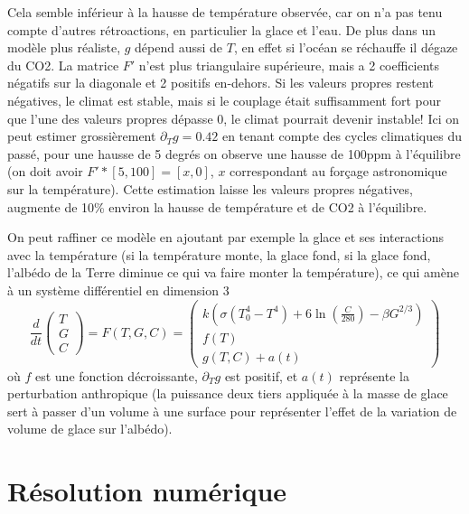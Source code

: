 \documentclass[a4paper,11pt]{book}
\begin{document}
\begin{giacjshere}
Cela semble inf\'erieur \`a la hausse de temp\'erature observ\'ee,
car on n'a pas tenu compte d'autres r\'etroactions, en particulier
la glace et l'eau.
De plus dans un mod\`ele plus r\'ealiste, $g$ d\'epend aussi de $T$, 
en effet si l'oc\'ean
se r\'echauffe il d\'egaze du CO2. La matrice $F'$ n'est plus triangulaire
sup\'erieure, mais a 2 coefficients n\'egatifs sur la diagonale et
2 positifs en-dehors. Si les valeurs propres restent n\'egatives,
le climat est stable, mais si le couplage \'etait suffisamment
fort pour que l'une des valeurs propres d\'epasse 0, 
le climat pourrait devenir instable! Ici on peut estimer grossi\`erement
$\partial_T g=0.42$ en tenant compte des cycles climatiques du pass\'e,
pour une hausse de 5 degr\'es on observe
une hausse de 100ppm \`a l'\'equilibre (on doit avoir $F'*[5,100]=[x,0]$,
$x$ correspondant au for\c{c}age astronomique sur la temp\'erature).
Cette estimation laisse les valeurs propres n\'egatives,
augmente de 10\% environ la hausse de temp\'erature et de CO2 \`a
l'\'equilibre.

On peut raffiner ce mod\`ele en ajoutant par exemple la glace
et ses interactions avec la temp\'erature (si la temp\'erature
monte, la glace fond, si la glace fond, l'alb\'edo de la Terre diminue
ce qui va faire monter la temp\'erature), ce qui am\`ene \`a un
syst\`eme diff\'erentiel en dimension 3
\[ \frac{d}{dt} \left(\begin{array}{c}
T \\
G \\
C
\end{array}\right) =
F(T,G,C) = \left(\begin{array}{c}
k (\sigma(T_0^4-T^4)+6 \ln(\frac{C}{280}) - \beta G^{2/3} ) \\
f(T) \\
g(T,C) + a(t)
\end{array}\right)
\]
o\`u $f$ est une fonction d\'ecroissante, $\partial_T g$ est positif,
et $a(t)$ repr\'esente la perturbation anthropique (la puissance deux
tiers appliqu\'ee \`a la masse de glace sert \`a passer d'un volume
\`a une surface pour repr\'esenter l'effet de la variation de volume
de glace sur l'alb\'edo).


\section{Résolution numérique}

\end{giacjshere}
\end{document}
